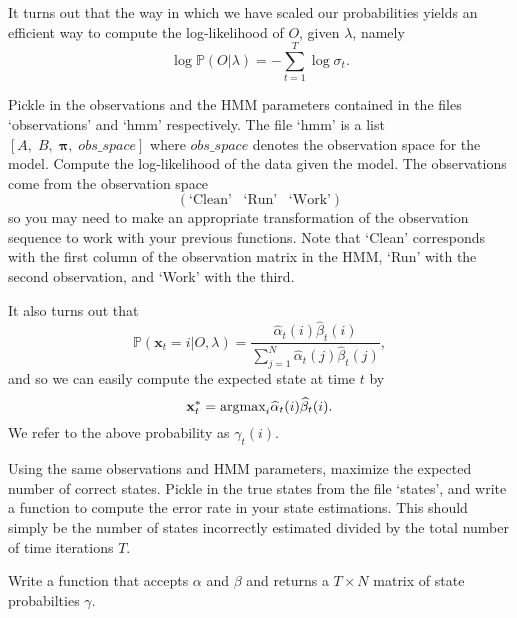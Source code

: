 It turns out that the way in which we have scaled our probabilities yields an efficient way to compute the log-likelihood of $O$, given $\lambda$, namely
$$\log \mathbb{P}(O | \lambda) = - \sum_{t=1}^{T} \log \sigma_{t}.$$

\begin{problem}
Pickle in the observations and the HMM parameters contained in the files `observations' and `hmm' respectively. The file `hmm' is a list $\left[ A, \; B, \; \mathbf{\pi}, \; obs\_space \right]$ where $obs\_space$ denotes the observation space for the model. Compute the log-likelihood of the data given the model. The observations come from the observation space $$\left( \text{`Clean'} \; \; \; \text{`Run'} \; \; \; \text{`Work'} \right)$$ so you may need to make an appropriate transformation of the observation sequence to work with your previous functions. Note that `Clean' corresponds with the first column of the observation matrix in the HMM, `Run' with the second observation, and `Work' with the third.
\end{problem}

It also turns out that $$\mathbb{P}(\mathbf{x}_{t} = i | O, \lambda) = \frac{\widehat{\alpha}_{t}(i)\widehat{\beta}_{t}(i)}{\sum_{j=1}^{N} \widehat{\alpha}_{t}(j)\widehat{\beta}_{t}(j)},$$ and so we can easily compute the expected state at time $t$ by $$\mathbf{x}_{t}^{*} = \text{argmax}_{i} \widehat{\alpha}_{t}(i) \widehat{\beta}_{t}(i).$$ We refer to the above probability as $\gamma_{t}(i)$.

\begin{problem}
Using the same observations and HMM parameters, maximize the expected number of correct states. Pickle in the true states from the file `states', and write a function to compute the error rate in your state estimations. This should simply be the number of states incorrectly estimated divided by the total number of time iterations $T$.
\end{problem}

\begin{problem}
Write a function that accepts $\alpha$ and $\beta$ and returns a $T \times N$ matrix of state probabilties $\gamma$.
\end{problem}